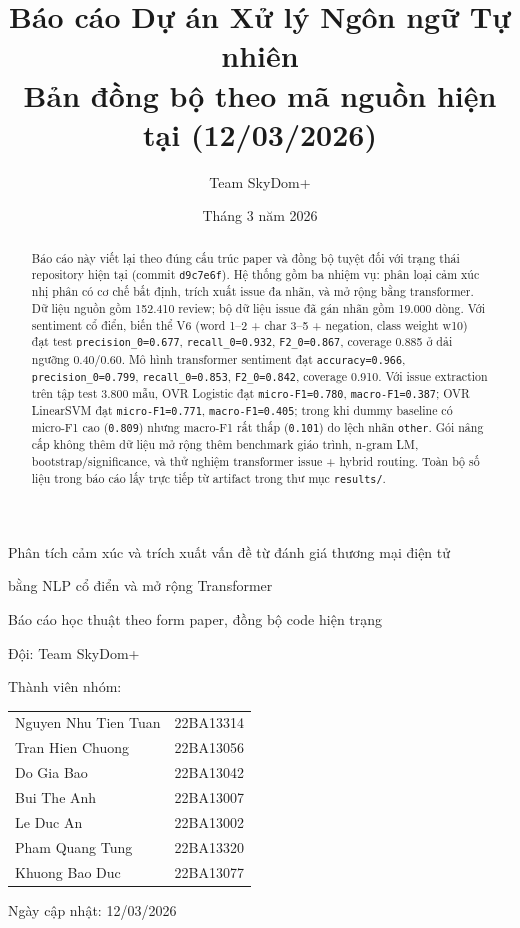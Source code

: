 ﻿\documentclass[12pt,a4paper]{article}
\title{Báo cáo Dự án Xử lý Ngôn ngữ Tự nhiên\\
Bản đồng bộ theo mã nguồn hiện tại (12/03/2026)}
\author{Team SkyDom+}
\date{Tháng 3 năm 2026}
\begin{document}
\begin{titlepage}
\centering
\vspace*{1.0cm}
{\LARGE Phân tích cảm xúc và trích xuất vấn đề từ đánh giá thương mại điện tử\par}
\vspace{0.2cm}
{\LARGE bằng NLP cổ điển và mở rộng Transformer\par}
\vspace{0.8cm}
{\Large Báo cáo học thuật theo form paper, đồng bộ code hiện trạng\par}
\vspace{0.8cm}
{\large Đội: Team SkyDom+\par}
\vspace{0.3cm}
{\large Thành viên nhóm:\par}
\vspace{0.4cm}
{\large
\begin{tabular}{@{}>{\raggedright\arraybackslash}p{5.8cm} >{\raggedright\arraybackslash}p{2.7cm}@{}}
Nguyen Nhu Tien Tuan & 22BA13314 \\
Tran Hien Chuong & 22BA13056 \\
Do Gia Bao & 22BA13042 \\
Bui The Anh & 22BA13007 \\
Le Duc An & 22BA13002 \\
Pham Quang Tung & 22BA13320 \\
Khuong Bao Duc & 22BA13077 \\
\end{tabular}\par}
\vfill
{\large Ngày cập nhật: 12/03/2026\par}
\end{titlepage}


\begin{abstract}
Báo cáo này viết lại theo đúng cấu trúc paper và đồng bộ tuyệt đối với trạng thái repository hiện tại (commit \texttt{d9c7e6f}). Hệ thống gồm ba nhiệm vụ: phân loại cảm xúc nhị phân có cơ chế bất định, trích xuất issue đa nhãn, và mở rộng bằng transformer. Dữ liệu nguồn gồm 152.410 review; bộ dữ liệu issue đã gán nhãn gồm 19.000 dòng. Với sentiment cổ điển, biến thể V6 (word 1--2 + char 3--5 + negation, class weight w10) đạt test \texttt{precision\_0=0.677}, \texttt{recall\_0=0.932}, \texttt{F2\_0=0.867}, coverage 0.885 ở dải ngưỡng 0.40/0.60. Mô hình transformer sentiment đạt \texttt{accuracy=0.966}, \texttt{precision\_0=0.799}, \texttt{recall\_0=0.853}, \texttt{F2\_0=0.842}, coverage 0.910. Với issue extraction trên tập test 3.800 mẫu, OVR Logistic đạt \texttt{micro-F1=0.780}, \texttt{macro-F1=0.387}; OVR LinearSVM đạt \texttt{micro-F1=0.771}, \texttt{macro-F1=0.405}; trong khi dummy baseline có micro-F1 cao (\texttt{0.809}) nhưng macro-F1 rất thấp (\texttt{0.101}) do lệch nhãn \texttt{other}. Gói nâng cấp không thêm dữ liệu mở rộng thêm benchmark giáo trình, n-gram LM, bootstrap/significance, và thử nghiệm transformer issue + hybrid routing. Toàn bộ số liệu trong báo cáo lấy trực tiếp từ artifact trong thư mục \texttt{results/}.
\end{abstract}
\end{document}
